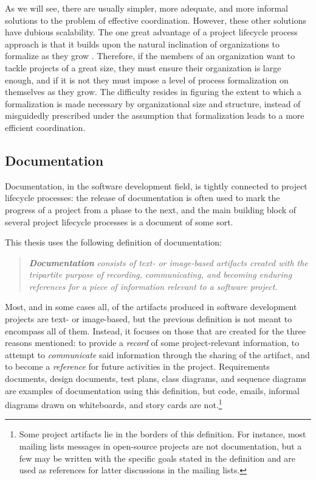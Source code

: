 As we will see, there are usually simpler, more adequate, and more informal solutions to the problem of effective coordination. However, these other solutions have dubious scalability. The one great advantage of a project lifecycle process approach is that it builds upon the natural inclination of organizations to formalize as they grow \cite{Blau1971,Haveman1993}. Therefore, if the members of an organization want to tackle projects of a great size, they must ensure their organization is large enough, and if it is not they must impose a level of process formalization on themselves as they grow. The difficulty resides in figuring the extent to which a formalization is made necessary by organizational size and structure, instead of misguidedly prescribed under the assumption that formalization leads to a more efficient coordination.



\subsection{Documentation}

Documentation, in the software development field, is tightly connected to project lifecycle processes: the release of documentation is often used to mark the progress of a project from a phase to the next, and the main building block of several project lifecycle processes is a document of some sort.

This thesis uses the following definition of documentation:

\begin{quote}
\emph{\textbf{Documentation} consists of text- or image-based artifacts created with the tripartite purpose of recording, communicating, and becoming enduring references for a piece of information relevant to a software project.}
\end{quote}

Most, and in some cases all, of the artifacts produced in software development projects are text- or image-based, but the previous definition is not meant to encompass all of them. Instead, it focuses on those that are created for the three reasons mentioned: to provide a \emph{record} of some project-relevant information, to attempt to \emph{communicate} said information through the sharing of the artifact, and to become a \emph{reference} for future activities in the project. Requirements documents, design documents, test plans, class diagrams, and sequence diagrams are examples of documentation using this definition, but code, emails, informal diagrams drawn on whiteboards, and story cards are not.\footnote{Some project artifacts lie in the borders of this definition. For instance, most mailing lists messages in open-source projects are not documentation, but a few may be written with the specific goals stated in the definition and are used as references for latter discussions in the mailing lists.}

